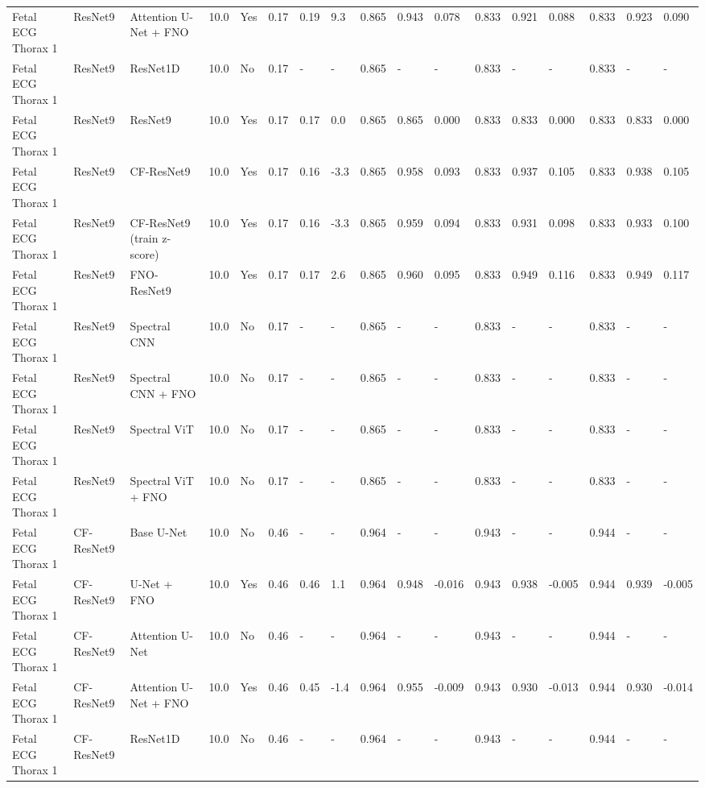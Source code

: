 \begin{longtable}{lllllllllllllllll}
Fetal ECG Thorax 1 & ResNet9 & Attention U-Net + FNO & 10.0 & Yes & 0.17 & 0.19 & 9.3 & 0.865 & 0.943 & 0.078 & 0.833 & 0.921 & 0.088 & 0.833 & 0.923 & 0.090 \\
Fetal ECG Thorax 1 & ResNet9 & ResNet1D & 10.0 & No & 0.17 & - & - & 0.865 & - & - & 0.833 & - & - & 0.833 & - & - \\
Fetal ECG Thorax 1 & ResNet9 & ResNet9 & 10.0 & Yes & 0.17 & 0.17 & 0.0 & 0.865 & 0.865 & 0.000 & 0.833 & 0.833 & 0.000 & 0.833 & 0.833 & 0.000 \\
Fetal ECG Thorax 1 & ResNet9 & CF-ResNet9 & 10.0 & Yes & 0.17 & 0.16 & -3.3 & 0.865 & 0.958 & 0.093 & 0.833 & 0.937 & 0.105 & 0.833 & 0.938 & 0.105 \\
Fetal ECG Thorax 1 & ResNet9 & CF-ResNet9 (train z-score) & 10.0 & Yes & 0.17 & 0.16 & -3.3 & 0.865 & 0.959 & 0.094 & 0.833 & 0.931 & 0.098 & 0.833 & 0.933 & 0.100 \\
Fetal ECG Thorax 1 & ResNet9 & FNO-ResNet9 & 10.0 & Yes & 0.17 & 0.17 & 2.6 & 0.865 & 0.960 & 0.095 & 0.833 & 0.949 & 0.116 & 0.833 & 0.949 & 0.117 \\
Fetal ECG Thorax 1 & ResNet9 & Spectral CNN & 10.0 & No & 0.17 & - & - & 0.865 & - & - & 0.833 & - & - & 0.833 & - & - \\
Fetal ECG Thorax 1 & ResNet9 & Spectral CNN + FNO & 10.0 & No & 0.17 & - & - & 0.865 & - & - & 0.833 & - & - & 0.833 & - & - \\
Fetal ECG Thorax 1 & ResNet9 & Spectral ViT & 10.0 & No & 0.17 & - & - & 0.865 & - & - & 0.833 & - & - & 0.833 & - & - \\
Fetal ECG Thorax 1 & ResNet9 & Spectral ViT + FNO & 10.0 & No & 0.17 & - & - & 0.865 & - & - & 0.833 & - & - & 0.833 & - & - \\
Fetal ECG Thorax 1 & CF-ResNet9 & Base U-Net & 10.0 & No & 0.46 & - & - & 0.964 & - & - & 0.943 & - & - & 0.944 & - & - \\
Fetal ECG Thorax 1 & CF-ResNet9 & U-Net + FNO & 10.0 & Yes & 0.46 & 0.46 & 1.1 & 0.964 & 0.948 & -0.016 & 0.943 & 0.938 & -0.005 & 0.944 & 0.939 & -0.005 \\
Fetal ECG Thorax 1 & CF-ResNet9 & Attention U-Net & 10.0 & No & 0.46 & - & - & 0.964 & - & - & 0.943 & - & - & 0.944 & - & - \\
Fetal ECG Thorax 1 & CF-ResNet9 & Attention U-Net + FNO & 10.0 & Yes & 0.46 & 0.45 & -1.4 & 0.964 & 0.955 & -0.009 & 0.943 & 0.930 & -0.013 & 0.944 & 0.930 & -0.014 \\
Fetal ECG Thorax 1 & CF-ResNet9 & ResNet1D & 10.0 & No & 0.46 & - & - & 0.964 & - & - & 0.943 & - & - & 0.944 & - & - \\

\end{longtable}
